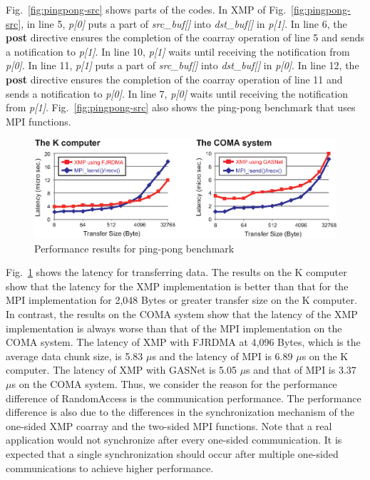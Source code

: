 \documentclass[graybox]{svmult}
\begin{document}
Fig.~\ref{fig:pingpong-src} shows parts of the codes.
In XMP of Fig.~\ref{fig:pingpong-src},
in line 5, {\it p[0]} puts a part of {\it src\_buf[]} into {\it dst\_buf[]} in {\it p[1]}.
In line 6, the {\bf post} directive ensures the completion of the coarray operation of line 5 and sends a notification to {\it p[1]}.
In line 10, {\it p[1]} waits until receiving the notification from {\it p[0]}.
In line 11, {\it p[1]} puts a part of {\it src\_buf[]} into {\it dst\_buf[]} in {\it p[0]}.
In line 12, the {\bf post} directive ensures the completion of the coarray operation of line 11 and sends a notification to {\it p[0]}.
In line 7, {\it p[0]} waits until receiving the notification from {\it p[1]}.
Fig.~\ref{fig:pingpong-src} also shows the ping-pong benchmark that uses MPI functions.

\begin{figure}[h]
\sidecaption
\includegraphics[scale=0.59,clip]{img/pingpong.eps}
\caption{Performance results for ping-pong benchmark\cite{hpca}}\label{fig:pingpong}
\end{figure}

Fig.~\ref{fig:pingpong} shows the latency for transferring data.
The results on the K computer show that
the latency for the XMP implementation is better than that for the MPI implementation for 2,048  Bytes or greater transfer size on the K computer.
In contrast,
the results on the COMA system show that
the latency of the XMP implementation is always worse than that of the MPI implementation on the COMA system.
The latency of XMP with FJRDMA at 4,096 Bytes, which is the average data chunk size, is 5.83 $\mu$s and
the latency of MPI is 6.89 $\mu$s on the K computer.
The latency of XMP with GASNet is 5.05 $\mu$s and
that of MPI is 3.37 $\mu$s on the COMA system.
Thus,
we consider the reason for the performance difference of RandomAccess is the communication performance.
The performance difference is also due to the differences in the synchronization mechanism of the one-sided XMP coarray and the two-sided MPI functions.
Note that a real application would not synchronize after every one-sided communication.
It is expected that a single synchronization should occur after multiple one-sided communications to achieve higher performance.
\end{document}
